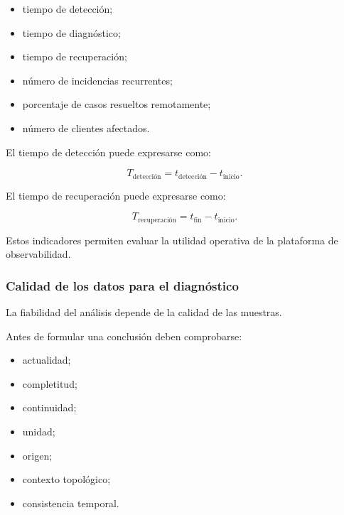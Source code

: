 \begin{itemize}
    \item tiempo de detección;

    \item tiempo de diagnóstico;

    \item tiempo de recuperación;

    \item número de incidencias recurrentes;

    \item porcentaje de casos resueltos remotamente;

    \item número de clientes afectados.
\end{itemize}

El tiempo de detección puede expresarse como:

\[
    T_{\mathrm{detección}}
    =
    t_{\mathrm{detección}}
    -
    t_{\mathrm{inicio}}.
\]

El tiempo de recuperación puede expresarse como:

\[
    T_{\mathrm{recuperación}}
    =
    t_{\mathrm{fin}}
    -
    t_{\mathrm{inicio}}.
\]

Estos indicadores permiten evaluar la utilidad operativa de la
plataforma de observabilidad.


\subsubsection*{Calidad de los datos para el diagnóstico}

La fiabilidad del análisis depende de la calidad de las muestras.

Antes de formular una conclusión deben comprobarse:

\begin{itemize}
    \item actualidad;

    \item completitud;

    \item continuidad;

    \item unidad;

    \item origen;

    \item contexto topológico;

    \item consistencia temporal.
\end{itemize}

